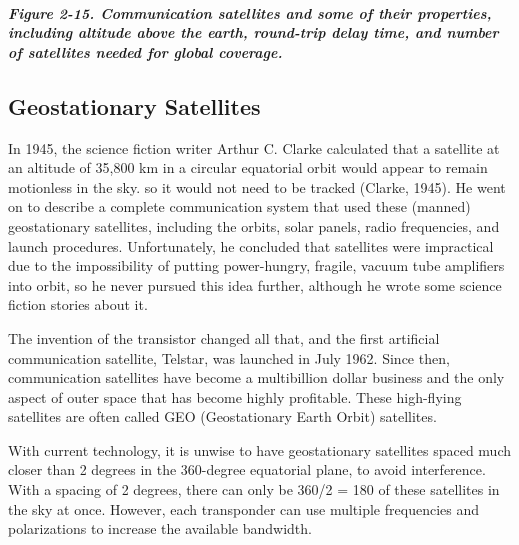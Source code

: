 \subparagraph[Figure 2-15. Communication satellites and some of their
properties, including altitude above the earth, round-trip delay time,
and number of satellites needed for global
coverage.]{\texorpdfstring{\protect\hypertarget{0130661023_ch02lev1sec4.htmlux5cux23ch02fig15}{}{}Figure
2-15. Communication satellites and some of their properties, including
altitude above the earth, round-trip delay time, and number of
satellites needed for global
coverage.}{Figure 2-15. Communication satellites and some of their properties, including altitude above the earth, round-trip delay time, and number of satellites needed for global coverage.}}


\protect\hypertarget{0130661023_ch02lev1sec4.htmlux5cux23ch02lev2sec13}{}{}

\subsection{Geostationary Satellites}

In 1945, the science fiction writer Arthur C. Clarke calculated that a
satellite at an altitude of 35,800 km in a circular equatorial orbit
would appear to remain motionless in the sky. so it would not need to be
tracked (Clarke, 1945). He went on to describe a complete communication
system that used these (manned) {geostationary satellites}, including
the orbits, solar panels, radio frequencies, and launch procedures.
Unfortunately, he concluded that satellites were impractical due to the
impossibility of putting power-hungry, fragile, vacuum tube amplifiers
into orbit, so he never pursued this idea further, although he wrote
some science fiction stories about it.

The invention of the transistor changed all that, and the first
artificial communication satellite, Telstar, was launched in July 1962.
Since then, communication satellites have become a multibillion dollar
business and the only aspect of outer space that has become highly
profitable. These high-flying satellites are often called {GEO}
({Geostationary Earth Orbit}) satellites.

With current technology, it is unwise to have geostationary satellites
spaced much closer than 2 degrees in the 360-degree equatorial plane, to
avoid interference. With a spacing of 2 degrees, there can only be 360/2
= 180 of these satellites in the sky at once. However, each transponder
can use multiple frequencies and polarizations to increase the available
bandwidth.


